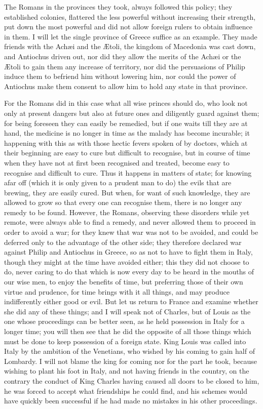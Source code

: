 \documentclass[12pt,letterpaper]{memoir}
\begin{document}
The Romans in the provinces they took, always followed this policy;
they established colonies, flattered the less powerful without
increasing their strength, put down the most powerful and did not allow
foreign rulers to obtain influence in them. I will let the single
province of Greece suffice as an example. They made friends with the
Achæi and the Ætoli, the kingdom of Macedonia was cast down, and
Antiochus driven out, nor did they allow the merits of the Achæi or the
Ætoli to gain them any increase of territory, nor did the persuasions
of Philip induce them to befriend him without lowering him, nor could
the power of Antiochus make them consent to allow him to hold any state
in that province.

For the Romans did in this case what all wise princes should do, who
look not only at present dangers but also at future ones and diligently
guard against them; for being foreseen they can easily be remedied,
but if one waits till they are at hand, the medicine is no longer in
time as the malady has become incurable; it happening with this as with
those hectic fevers spoken of by doctors, which at their beginning
are easy to cure but difficult to recognise, but in course of time
when they have not at first been recognised and treated, become easy
to recognise and difficult to cure. Thus it happens in matters of
state; for knowing afar off (which it is only given to a prudent man
to do) the evils that are brewing, they are easily cured. But when,
for want of such knowledge, they are allowed to grow so that every
one can recognise them, there is no longer any remedy to be found.
However, the Romans, observing these disorders while yet remote, were
always able to find a remedy, and never allowed them to proceed in
order to avoid a war; for they knew that war was not to be avoided,
and could be deferred only to the advantage of the other side; they
therefore declared war against Philip and Antiochus in Greece, so as
not to have to fight them in Italy, though they might at the time
have avoided either; this they did not choose to do, never caring to
do that which is now every day to be heard in the mouths of our wise
men, to enjoy the benefits of time, but preferring those of their
own virtue and prudence, for time brings with it all things, and may
produce indifferently either good or evil. But let us return to France
and examine whether she did any of these things; and I will speak not
of Charles, but of Louis as the one whose proceedings can be better
seen, as he held possession in Italy for a longer time; you will then
see that he did the opposite of all those things which must be done to
keep possession of a foreign state. King Louis was called into Italy by
the ambition of the Venetians, who wished by his coming to gain half
of Lombardy. I will not blame the king for coming nor for the part
he took, because wishing to plant his foot in Italy, and not having
friends in the country, on the contrary the conduct of King Charles
having caused all doors to be closed to him, he was forced to accept
what friendships he could find, and his schemes would have quickly
been successful if he had made no mistakes in his other proceedings.
\end{document}
